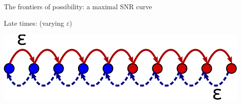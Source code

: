 \documentclass[final,hyperref={pdfpagelabels=false,bookmarks=false}]{beamer}
\DeclareMathOperator{\SNR}{SNR}
\begin{document}
\begin{frame}{}
\begin{columns}[t]
\begin{column}{0.32\linewidth}
\begin{block}{The frontiers of possibility: a maximal SNR curve}
{   %
   \vp Late times: (varying $\varepsilon$)
   \begin{center}
     \includegraphics[width=0.7\linewidth]{multistate_sticky.svg}
   \end{center}
}
%
\end{block}
%
%

\end{column}
\end{columns}
\end{frame}
\end{document}
